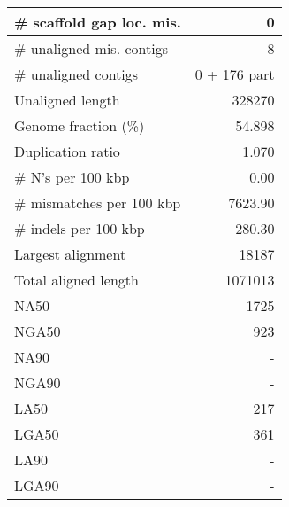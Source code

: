 \documentclass[12pt,a4paper]{article}
\begin{document}
\begin{table}[ht]
\begin{center}
\begin{tabular}{|l*{1}{|r}|}
\# scaffold gap loc. mis. & 0 \\ \hline
\# unaligned mis. contigs & 8 \\ \hline
\# unaligned contigs & 0 + 176 part \\ \hline
Unaligned length & 328270 \\ \hline
Genome fraction (\%) & 54.898 \\ \hline
Duplication ratio & 1.070 \\ \hline
\# N's per 100 kbp & 0.00 \\ \hline
\# mismatches per 100 kbp & 7623.90 \\ \hline
\# indels per 100 kbp & 280.30 \\ \hline
Largest alignment & 18187 \\ \hline
Total aligned length & 1071013 \\ \hline
NA50 & 1725 \\ \hline
NGA50 & 923 \\ \hline
NA90 & - \\ \hline
NGA90 & - \\ \hline
LA50 & 217 \\ \hline
LGA50 & 361 \\ \hline
LA90 & - \\ \hline
LGA90 & - \\ \hline
\end{tabular}
\end{center}
\end{table}
\end{document}
